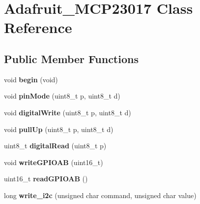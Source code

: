 \hypertarget{classAdafruit__MCP23017}{}\section{Adafruit\+\_\+\+M\+C\+P23017 Class Reference}
\label{classAdafruit__MCP23017}
\subsection*{Public Member Functions}
\begin{DoxyCompactItemize}
\item 
\mbox{\label{classAdafruit__MCP23017_a874577a57d334b8d0e81e86701bb156d}} 
void {\bfseries begin} (void)
\item 
\mbox{\label{classAdafruit__MCP23017_a6f2aea0d187cb281a4ed216fd31a6981}} 
void {\bfseries pin\+Mode} (uint8\+\_\+t p, uint8\+\_\+t d)
\item 
\mbox{\label{classAdafruit__MCP23017_a62c7101061540e9af47ea23d5b33fa81}} 
void {\bfseries digital\+Write} (uint8\+\_\+t p, uint8\+\_\+t d)
\item 
\mbox{\label{classAdafruit__MCP23017_ac24a9e4d33aceed6bcbaa08b6f12a99e}} 
void {\bfseries pull\+Up} (uint8\+\_\+t p, uint8\+\_\+t d)
\item 
\mbox{\label{classAdafruit__MCP23017_a00ee81c07e06502330b5e5a27372ac53}} 
uint8\+\_\+t {\bfseries digital\+Read} (uint8\+\_\+t p)
\item 
\mbox{\label{classAdafruit__MCP23017_a4b4845ea14d7207f22b0163ae5c622f2}} 
void {\bfseries write\+G\+P\+I\+O\+AB} (uint16\+\_\+t)
\item 
\mbox{\label{classAdafruit__MCP23017_a07d894fe9d749fd7d3d098c99ce1fa64}} 
uint16\+\_\+t {\bfseries read\+G\+P\+I\+O\+AB} ()
\item 
\mbox{\label{classAdafruit__MCP23017_a29e5ba320b6ce6812c42ab99f5f4c80d}} 
long {\bfseries write\+\_\+i2c} (unsigned char command, unsigned char value)

\end{DoxyCompactItemize}
